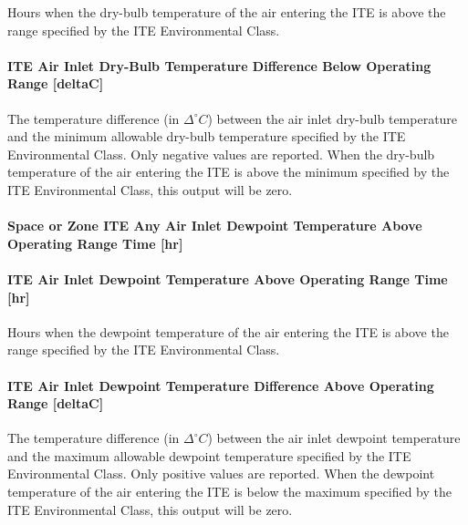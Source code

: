 Hours when the dry-bulb temperature of the air entering the ITE is above the range specified by the ITE Environmental Class.

\paragraph{ITE Air Inlet Dry-Bulb Temperature Difference Below Operating Range {[}deltaC{]}}\label{ite-air-inlet-dry-bulb-temperature-difference-below-operating-range-deltac}

The temperature difference (in $\Delta^{\circ}C$) between the air inlet dry-bulb temperature and the minimum allowable dry-bulb temperature specified by the ITE Environmental Class. Only negative values are reported. When the dry-bulb temperature of the air entering the ITE is above the minimum specified by the ITE Environmental Class, this output will be zero.

\paragraph{Space or Zone ITE Any Air Inlet Dewpoint Temperature Above Operating Range Time {[}hr{]}}\label{zone-ite-any-air-inlet-dewpoint-temperature-above-operating-range-time-hr}

\paragraph{ITE Air Inlet Dewpoint Temperature Above Operating Range Time {[}hr{]}}\label{ite-air-inlet-dewpoint-temperature-above-operating-range-time-hr}

Hours when the dewpoint temperature of the air entering the ITE is above the range specified by the ITE Environmental Class.

\paragraph{ITE Air Inlet Dewpoint Temperature Difference Above Operating Range {[}deltaC{]}}\label{ite-air-inlet-dewpoint-temperature-difference-above-operating-range-deltac}

The temperature difference (in $\Delta^{\circ}C$) between the air inlet dewpoint temperature and the maximum allowable dewpoint temperature specified by the ITE Environmental Class. Only positive values are reported. When the dewpoint temperature of the air entering the ITE is below the maximum specified by the ITE Environmental Class, this output will be zero.

